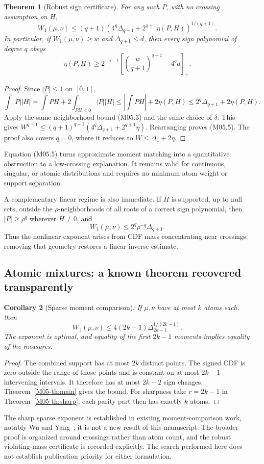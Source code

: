 \documentclass[11pt,a4paper]{article}
\newtheorem{theorem}{Theorem}[section]
\newtheorem{corollary}[theorem]{Corollary}
\theoremstyle{definition}\newtheorem{definition}[theorem]{Definition}
\theoremstyle{remark}\newtheorem{remark}[theorem]{Remark}
\numberwithin{equation}{section}
\begin{document}
\begin{theorem}[Robust sign certificate]\label{M05-th:robust}
For any such $P$, with no crossing assumption on $H$,
\[
 W_1(\mu,\nu)
 \le(q+1)\left(4^q\Delta_{q+1}
                  +2^{q+1}\eta(P,H)\right)^{1/(q+1)}.\tag{M05.4}
\]
In particular, if $W_1(\mu,\nu)\ge w$ and $\Delta_{q+1}\le d$, then every sign polynomial of degree $q$ obeys
\[
 \eta(P,H)\ge2^{-q-1}\left[\left(\frac{w}{q+1}\right)^{q+1}-4^q d\right]_+.\tag{M05.5}
\]
\end{theorem}
\begin{proof}
Since $|P|\le1$ on $[0,1]$,
\[
 \int|P||H|=\int PH+2\int_{PH<0}|P||H|
 \le\left|\int PH\right|+2\eta(P,H)
 \le2^q\Delta_{q+1}+2\eta(P,H).
\]
Apply the same neighborhood bound (M05.3) and the same choice of $\delta$. This gives
$W^{q+1}\le(q+1)^{q+1}(4^q\Delta_{q+1}+2^{q+1}\eta)$.
Rearranging proves (M05.5). The proof also covers $q=0$, where it reduces to $W\le\Delta_1+2\eta$.
\end{proof}
Equation (M05.5) turns approximate moment matching into a quantitative obstruction to a low-crossing explanation. It remains valid for continuous, singular, or atomic distributions and requires no minimum atom weight or support separation.

A complementary linear regime is also immediate. If $H$ is supported, up to null sets, outside the $\rho$-neighborhoods of all roots of a correct sign polynomial, then $|P|\ge\rho^q$ wherever $H\ne0$, and
\[
 W_1(\mu,\nu)\le2^q\rho^{-q}\Delta_{q+1}.
\]
Thus the nonlinear exponent arises from CDF mass concentrating near crossings; removing that geometry restores a linear inverse estimate.

\subsection{Atomic mixtures: a known theorem recovered transparently}\label{M05-sec-5}
\begin{corollary}[Sparse moment comparison]
If $\mu,\nu$ have at most $k$ atoms each, then
\[
 W_1(\mu,\nu)\le4(2k-1)\Delta_{2k-1}^{1/(2k-1)}.
\]
The exponent is optimal, and equality of the first $2k-1$ moments implies equality of the measures.
\end{corollary}
\begin{proof}
The combined support has at most $2k$ distinct points. The signed CDF is zero outside the range of those points and is constant on at most $2k-1$ intervening intervals. It therefore has at most $2k-2$ sign changes. Theorem~\ref{M05-th:main} gives the bound. For sharpness take $r=2k-1$ in Theorem~\ref{M05-th:sharp}; each parity part then has exactly $k$ atoms.
\end{proof}
The sharp sparse exponent is established in existing moment-comparison work, notably Wu and Yang~\cite{ref018}; it is not a new result of this manuscript. The broader proof is organized around crossings rather than atom count, and the robust violating-mass certificate is recorded explicitly. The search performed here does not establish publication priority for either formulation.
\end{document}
